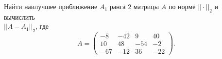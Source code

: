 \renewcommand{\leq}{\leqslant}
\renewcommand{\geq}{\geqslant}
\newcommand{\eps}{\varepsilon}



\begin{problem}
    Найти наилучшее приближение $A_1$ ранга $2$ матрицы $A$ по норме
    $||\cdot||_2$ и вычислить\\ $||A - A_1||_2$, где
    \begin{equation*}
        A =
        \begin{pmatrix}
            -8 & -42 & 9 & 40\\
            10 & 48 & -54 & -2\\
            -67 & -12 & 36 & -22
        \end{pmatrix}.
    \end{equation*}
\end{problem}


